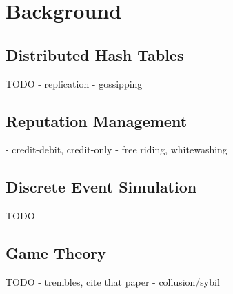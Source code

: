 \chapter{Background}
\label{chap:background}
\section{Distributed Hash Tables}
TODO
- replication
- gossipping
\section{Reputation Management}
- credit-debit, credit-only
- free riding, whitewashing
\section{Discrete Event Simulation}
TODO
\section{Game Theory}
TODO
- trembles, cite that paper
- collusion/sybil
